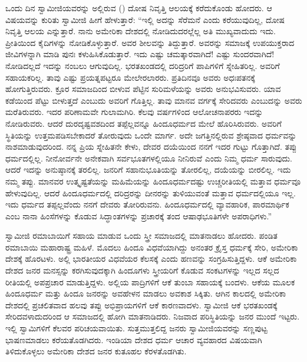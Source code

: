 ಒಂದು ದಿನ ಸ್ವಾಮೀಜಿಯವರನ್ನು ಅಲ್ಲಿರುವ () ದೋಷ ನಿವೃತ್ತಿ ಆಲಯಕ್ಕೆ ಕರೆದುಕೊಂಡು ಹೋದರು. ಆ ವಿಷಯವನ್ನು ಕುರಿತು ಸ್ವಾಮೀಜಿ ಹೀಗೆ ಹೇಳುತ್ತಾರೆ: “ಇಲ್ಲಿ ಅದನ್ನು ಸೆರೆಮನೆ ಎಂದು ಕರೆಯುವುದಿಲ್ಲ, ದೋಷ ನಿವೃತ್ತಿ ಆಲಯ ಎನ್ನುತ್ತಾರೆ. ನಾನು ಅಮೇರಿಕಾ ದೇಶದಲ್ಲಿ ನೋಡಿದುದರಲ್ಲೆಲ್ಲ ಅತಿ ಮುಖ್ಯವಾದುದು ಇದು. ಪ್ರೀತಿಯಿಂದ ಕೈದಿಗಳನ್ನು ನೋಡಿಕೊಳ್ಳುತ್ತಾರೆ. ಅವರ ಶೀಲವನ್ನು ತಿದ್ದುತ್ತಾರೆ. ಅವರನ್ನು ಸಮಾಜಕ್ಕೆ ಉಪಯುಕ್ತರಾದ ಜೀವಿಗಳನ್ನಾಗಿ ಮಾಡಿ ಪುನಃ ಕಳುಹಿಸಿಕೊಡುತ್ತಾರೆ. ಇದು ಎಷ್ಟು ಚಮತ್ಕಾರವಾಗಿದೆ! ಎಷ್ಟು ಸುಂದರವಾಗಿದೆ! ನೋಡಿದಲ್ಲದೆ ಇದನ್ನು ನಂಬಲು ಆಗುವುದಿಲ್ಲ. ಭರತಖಂಡದಲ್ಲಿ ದರಿದ್ರರಿಗೆ ಪಾಪಿಗಳಿಗೆ ಸ್ನೇಹಿತರಿಲ್ಲ. ಅವರಿಗೆ ಸಹಾಯಕರಿಲ್ಲ. ತಾವು ಎಷ್ಟು ಪ್ರಯತ್ನಪಟ್ಟರೂ ಮೇಲೇರಲಾರರು. ಪ್ರತಿದಿನವೂ ಅವರು ಅಧಃಪತನಕ್ಕೆ ಹೋಗುತ್ತಿರುವರು. ಕ್ರೂರ ಸಮಾಜದಿಂದ ಬೀಳುವ ಪೆಟ್ಟಿನ ಸುರಿಮಳೆಯನ್ನು ಅವರು ಅನುಭವಿಸುವರು. ಯಾವ ಕಡೆಯಿಂದ ಪೆಟ್ಟು ಬೀಳುತ್ತದೆ ಎಂಬುದು ಅವರಿಗೆ ಗೊತ್ತಿಲ್ಲ. ತಾವು ಮಾನವ ವರ್ಗಕ್ಕೆ ಸೇರಿದವರು ಎಂಬುದನ್ನು ಅವರು ಮರೆತಿರುವರು. ಇದರ ಪರಿಣಾಮವೇ ಗುಲಾಮಗಿರಿ. ಕೆಲವು ವರ್ಷಗಳಿಂದ ಆಲೋಚನಾಪರರು ಇದನ್ನು ನೋಡಿರುವರು. ಆದರೆ ದುರದೃಷ್ಟವಶದಿಂದ ತಪ್ಪೆಲ್ಲವನ್ನೂ ಹಿಂದೂಧರ್ಮದ ಮೇಲೆ ಹೊರಿಸಿರುವರು. ಅವರಿಗೆ ಸ್ಥಿತಿಯನ್ನು ಉತ್ತಮಪಡಿಸಬೇಕಾದರೆ ತೋರುವುದು ಒಂದೇ ಮಾರ್ಗ. ಅದೇ ಜಗತ್ತಿನಲ್ಲಿರುವ ಶ್ರೇಷ್ಠವಾದ ಧರ್ಮವನ್ನು ನಾಶಮಾಡುವುದರಿಂದ. ನನ್ನ ಪ್ರಿಯ ಸ್ನೇಹಿತನೇ ಕೇಳು, ದೇವರ ದಯೆಯಿಂದ ನನಗೆ ಇದರ ಗುಟ್ಟು ಗೊತ್ತಾಗಿದೆ. ತಪ್ಪು ಧರ್ಮದಲ್ಲಿಲ್ಲ. ನೀನೋರ್ವನೇ ಅನೇಕವಾಗಿ ಸರ್ವಭೂತಗಳಲ್ಲಿಯೂ ನೀನಿರುವೆ ಎಂದು ನಿಮ್ಮ ಧರ್ಮ ಸಾರುವುದು. ಆದರೆ ಇದನ್ನು ಅನುಷ್ಠಾನಕ್ಕೆ ತರಲಿಲ್ಲ. ಜನರಿಗೆ ಸಹಾನುಭೂತಿಯನ್ನು ತೋರಲಿಲ್ಲ, ದಯೆಯನ್ನು ಬೀರಲಿಲ್ಲ. ಇದು ನಮ್ಮ ತಪ್ಪು. ಮಾನವರ ಉತ್ಕೃಷ್ಟತೆಯನ್ನು ಮಹಿಮೆಯನ್ನು ಹಿಂದೂಧರ್ಮದಷ್ಟು ಉಚ್ಚರೀತಿಯಲ್ಲಿ ಮತ್ತಾವ ಧರ್ಮವೂ ಹೇಳುವುದಿಲ್ಲ. ಆದರೆ ಹಿಂದೂಧರ್ಮದಲ್ಲಿ ದರಿದ್ರರನ್ನು ದೀನರನ್ನು ತುಳಿಯುವಂತೆ ಮತ್ತಾವ ಧರ್ಮದಲ್ಲಿಯೂ ಇಲ್ಲ. ಇದು ಧರ್ಮದ ತಪ್ಪಲ್ಲವೆಂದು ನನಗೆ ದೇವರು ತೋರಿರುವನು. ಹಿಂದೂಧರ್ಮದಲ್ಲಿ ವ್ಯಾವಹಾರಿಕ, ಪಾರಮಾರ್ಥಿಕ ಎಂಬ ನಾನಾ ಹಿಂಸೆಗಳನ್ನು ಕೊಡುವ ಸಿದ್ಧಾಂತಗಳನ್ನು ಪ್ರಚಾರಕ್ಕೆ ತಂದ ಆಷಾಢಭೂತಿಗಳೇ ಅಪರಾಧಿಗಳು.” 

 ಸ್ವಾಮೀಜಿ ರಮಾಬಾಯಿಗೆ ಸಹಾಯ ಮಾಡುವ ಒಂದು ಸ್ತ್ರೀ ಸಮಾಜದಲ್ಲಿ ಮಾತನಾಡಲು ಹೋದರು. ಪಂಡಿತ ರಮಾಬಾಯಿ ಮಹಾರಾಷ್ಟ್ರ ಮಹಿಳೆ. ಮೊದಲು ಹಿಂದೂ ವಿಧವೆಯಾಗಿದ್ದು ಅನಂತರ ಕ್ರೈಸ್ತ ಧರ್ಮಕ್ಕೆ ಸೇರಿ, ಅಮೇರಿಕಾ ದೇಶಕ್ಕೆ ಹೊರಟಳು. ಅಲ್ಲಿ ಭಾರತೀಯರ ವಿಧವೆಯರ ಕೆಲಸಕ್ಕೆ ಎಂದು ಹಣವನ್ನು ಸಂಗ್ರಹಿಸು\-ತ್ತಿದ್ದಳು. ಆಕೆ ಅಮೇರಿಕಾ ದೇಶದ ಜನರ ಮನಸ್ಸನ್ನು ಕರಗಿಸುವುದಕ್ಕಾಗಿ ಹಿಂದೂಗಳು ಸ್ತ್ರೀಯರಿಗೆ ಕೊಡುವ ಸಂಕಟಗಳನ್ನು ಇಲ್ಲದ ಸಲ್ಲದ ರೀತಿಯಲ್ಲಿ ಅಪಪ್ರಚಾರ ಮಾಡುತ್ತಿದ್ದಳು. ಅಲ್ಲಿಯ ಪಾದ್ರಿಗಳಿಗೆ ಆಕೆ ತುಂಬಾ ಸಹಾಯಕ್ಕೆ ಬಂದಳು. ಆಕೆಯ ಮೂಲಕ ಹಿಂದೂಧರ್ಮ ಮತ್ತು ಹಿಂದೂ ಜನರನ್ನು ಅವಹೇಳನ ಮಾಡಲು ಅವಕಾಶ ಸಿಕ್ಕಿತು. ಆಗಿನ ಕಾಲದಲ್ಲಿ ಅಮೇರಿಕಾ ದೇಶದಲ್ಲಿ ಪ್ರಚಲಿತವಾದ ಹಲವು ತಪ್ಪು ಅಭಿಪ್ರಾಯಗಳಿಗೆ ಆಕೆ ಕಾರಣವಾದಳು. ಸ್ವಾಮೀಜಿ ಆಕೆ ಭರತಖಂಡಕ್ಕೆ ಸೇರಿದವಳಾದುದರಿಂದ ಆ ಸಮಾಜದಲ್ಲಿ ಹೋಗಿ ಮಾತನಾಡಿದರು. ನಿಜವಾದ ಪರಿಸ್ಥಿತಿಯನ್ನು ಜನರ ಮುಂದೆ ಇಟ್ಟರು. ಇಲ್ಲಿ ಸ್ವಾಮಿಗಳಿಗೆ ಕೆಲವರ ಪರಿಚಯವಾಯಿತು. ಸುತ್ತಮುತ್ತಲಿದ್ದ ಜನರು ಸ್ವಾಮೀಜಿಯವರನ್ನು ಸಣ್ಣಪುಟ್ಟ ಭಾಷಣಮಾಡಲು ಕರೆಯತೊಡಗಿದರು. ಇಂಡಿಯಾ ದೇಶದ ಧರ್ಮ ಆಚಾರ ವ್ಯವಹಾರದ ವಿಷಯವಾಗಿ ತಿಳಿದುಕೊಳ್ಳಲು ಅಮೇರಿಕಾ ದೇಶದ ಜನರ ಕುತೂಹಲ ಕೆರಳತೊಡಗಿತು. 

